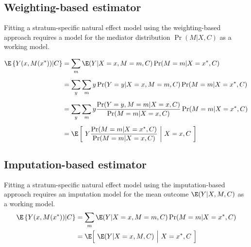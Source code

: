 \documentclass[nojss]{jss}
\begin{document}
\subsection[]{Weighting-based estimator \citep{Lange2012}}\label{app:weightest}
Fitting a stratum-specific natural effect model using the weighting-based approach requires a model for the mediator distribution $\Pr(M|X,C)$ as a working model.
\begin{fleqn}
\begin{align*}
\E\left\{Y(x,M(x^*))|C\right\} &= \sum_m \E(Y|X=x,M=m,C) \Pr(M=m|X=x^*,C)\\[5pt]
&= \sum_y \sum_m y \Pr(Y=y|X=x,M=m,C) \Pr(M=m|X=x^*,C)\\[5pt]
&= \sum_y \sum_m y \dfrac{\Pr(Y=y,M=m|X=x,C)}{\Pr(M=m|X=x,C)} \Pr(M=m|X=x^*,C)\\[5pt]
&= \E\left[\ Y \dfrac{\Pr(M=m|X=x^*,C)}{\Pr(M=m|X=x,C)} \ \middle\vert \ X=x,C
\ \right]
\end{align*}

\subsection[]{Imputation-based estimator \citep{Vansteelandt2012}}\label{app:impest}
Fitting a stratum-specific natural effect model using the imputation-based approach requires an imputation model for the mean outcome $\E(Y|X,M,C)$ as a working model.
\begin{align*}
\E\left\{Y(x,M(x^*))|C\right\} &= \sum_m \E(Y|X=x,M=m,C) \Pr(M=m|X=x^*,C) \nonumber\\
&= \E\Big[\ \E(Y|X=x,M,C) \ \Big\vert \ X=x^*,C
\ \Big]
\end{align*}


\end{fleqn}
\end{document}
